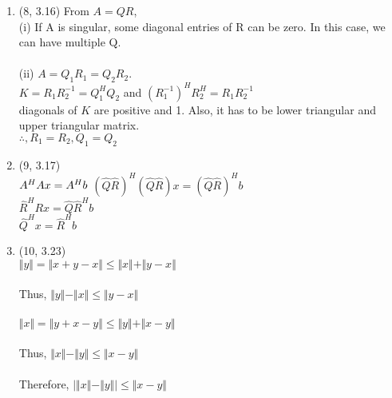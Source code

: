 \documentclass[letterpaper,12pt]{article}
\theoremstyle{definition}
\begin{document}
\begin{enumerate}
	\item (8, 3.16) From $ A=QR$,\\ (i) If A is singular, some diagonal entries of R can be zero. In this case, 			we can have multiple Q. \\ \\
			(ii) $A=Q_{1}R_{1}=Q_{2}R_{2}.$ \\
			$K = R_{1}R_{2}^{-1} = Q_{1}^{H}Q_{2}$ and $(R_{1}^{-1})^{H}R_{2}^{H} = R_{1}R_{2}^{-1}$\\
			 diagonals of $K$ are positive and 1. Also, it has to be lower triangular and upper triangular matrix.\\
			$\therefore, R_{1}=R_{2}, Q_{1} = Q_{2}$


	\item (9, 3.17) \\
		$A^{H}Ax=A^{H}b \\$
		$(\hat{Q} \hat{R})^H(\hat{Q}\hat{R})x=(\hat{Q}\hat{R})^Hb$ \\
		$\hat{R}^HRx=\hat{Q}\hat{R}^Hb$ \\
		$\hat{Q}^Hx=\hat{R}^Hb$


	\item (10, 3.23) \\
$\Vert y \Vert = \Vert x + y - x \Vert \leq \Vert x \Vert + \Vert y-x \Vert $
\\
\\
Thus, $\Vert y \Vert - \Vert x \Vert \leq \Vert y-x \Vert $
\\
\\
$\Vert x \Vert = \Vert y + x -y \Vert \leq \Vert y \Vert + \Vert x-y \Vert $
\\
\\
Thus, $\Vert x \Vert - \Vert y \Vert \leq \Vert x-y \Vert $
\\
\\
Therefore, $\vert \Vert x \Vert - \Vert y \Vert \vert \leq \Vert x-y \Vert$




\end{enumerate}
\end{document}
